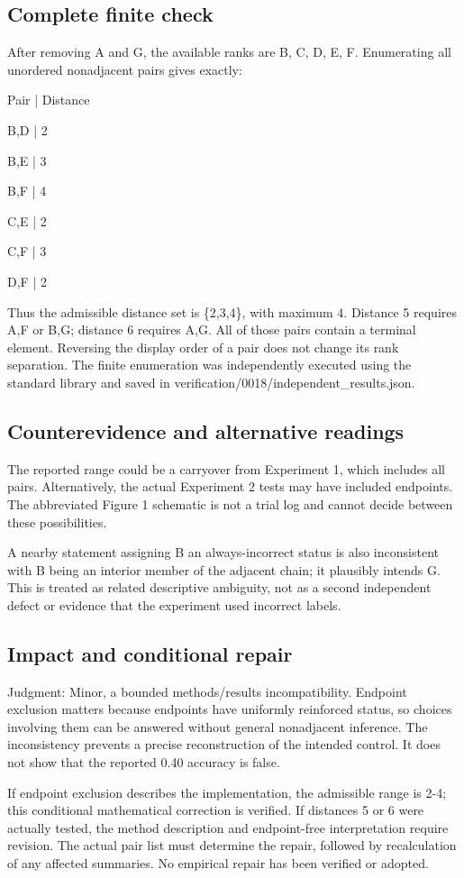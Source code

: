 \documentclass[10pt]{article}
\begin{document}
\subsection*{Complete finite check}
After removing A and G, the available ranks are B, C, D, E, F. Enumerating all unordered nonadjacent pairs gives exactly:\par
Pair | Distance\par
B,D | 2\par
B,E | 3\par
B,F | 4\par
C,E | 2\par
C,F | 3\par
D,F | 2\par
Thus the admissible distance set is \{2,3,4\}, with maximum 4. Distance 5 requires A,F or B,G; distance 6 requires A,G. All of those pairs contain a terminal element. Reversing the display order of a pair does not change its rank separation. The finite enumeration was independently executed using the standard library and saved in verification/0018/independent\_results.json.\par
\subsection*{Counterevidence and alternative readings}
The reported range could be a carryover from Experiment 1, which includes all pairs. Alternatively, the actual Experiment 2 tests may have included endpoints. The abbreviated Figure 1 schematic is not a trial log and cannot decide between these possibilities.\par
A nearby statement assigning B an always-incorrect status is also inconsistent with B being an interior member of the adjacent chain; it plausibly intends G. This is treated as related descriptive ambiguity, not as a second independent defect or evidence that the experiment used incorrect labels.\par
\subsection*{Impact and conditional repair}
Judgment: Minor, a bounded methods/results incompatibility. Endpoint exclusion matters because endpoints have uniformly reinforced status, so choices involving them can be answered without general nonadjacent inference. The inconsistency prevents a precise reconstruction of the intended control. It does not show that the reported 0.40 accuracy is false.\par
If endpoint exclusion describes the implementation, the admissible range is 2-4; this conditional mathematical correction is verified. If distances 5 or 6 were actually tested, the method description and endpoint-free interpretation require revision. The actual pair list must determine the repair, followed by recalculation of any affected summaries. No empirical repair has been verified or adopted.\par
\end{document}
